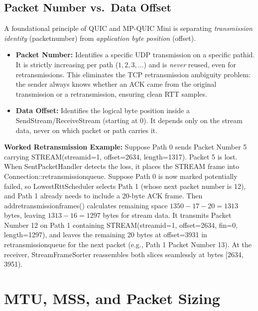 \documentclass[10pt,a4paper]{article}
\newcommand{\codeul}{\textunderscore\hspace{0pt}}
\DeclareRobustCommand{\code}[1]{{\ttfamily\let\_\codeul #1}}
\begin{document}
\subsection{Packet Number vs.\ Data Offset}
A foundational principle of QUIC and MP-QUIC Mini is separating \emph{transmission identity} (\code{packet\_number}) from \emph{application byte position} (\code{offset}).
\begin{itemize}
    \item \textbf{Packet Number:} Identifies a specific UDP transmission on a specific \code{path\_id}. It is strictly increasing per path ($1, 2, 3, \dots$) and is \emph{never} reused, even for retransmissions. This eliminates the TCP retransmission ambiguity problem: the sender always knows whether an ACK came from the original transmission or a retransmission, ensuring clean RTT samples.
    \item \textbf{Data Offset:} Identifies the logical byte position inside a \code{SendStream}/\code{ReceiveStream} (starting at $0$). It depends only on the stream data, never on which packet or path carries it.
\end{itemize}
\textbf{Worked Retransmission Example:} Suppose Path 0 sends Packet Number \code{5} carrying \code{STREAM(stream\_id=1, offset=2634, length=1317)}. Packet 5 is lost. When \code{SentPacketHandler} detects the loss, it places the \code{STREAM} frame into \code{Connection::retransmission\_queue}. Suppose Path 0 is now marked potentially failed, so \code{LowestRttScheduler} selects Path 1 (whose next packet number is \code{12}), and Path 1 already needs to include a 20-byte \code{ACK} frame. Then \code{add\_retransmission\_frames()} calculates remaining space $1350 - 17 - 20 = 1313$ bytes, leaving $1313 - 16 = 1297$ bytes for stream data. It transmits Packet Number \code{12} on Path 1 containing \code{STREAM(stream\_id=1, offset=2634, fin=0, length=1297)}, and leaves the remaining 20 bytes at \code{offset=3931} in \code{retransmission\_queue} for the next packet (e.g., Path 1 Packet Number \code{13}). At the receiver, \code{StreamFrameSorter} reassembles both slices seamlessly at bytes \code{[2634, 3951)}.

\section{MTU, MSS, and Packet Sizing}
\end{document}
